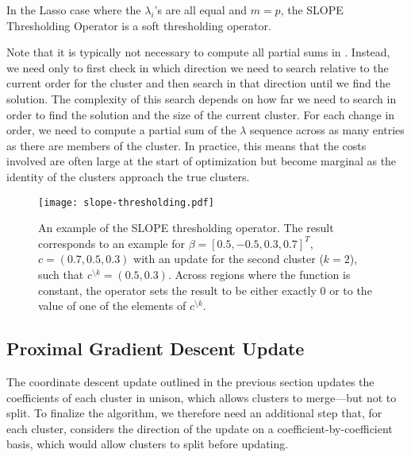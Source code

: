 
\begin{remark}
  In the Lasso case where the $\lambda_i$'s are all equal and $m = p$, the SLOPE Thresholding Operator is a soft thresholding operator.
\end{remark}

Note that it is typically not necessary to compute all partial sums in .
Instead, we need only to first check in which direction we need to search relative to the current order for the cluster and then search in that direction until we find the solution.
The complexity of this search depends on how far we need to search in order to find the solution and the size of the current cluster.
For each change in order, we need to compute a partial sum of the \(\lambda\) sequence across as many entries as there are members of the cluster.
In practice, this means that the costs involved are often large at the start of optimization but become marginal as the identity of the clusters approach the true clusters.


\begin{figure*}[htb]
  \centering
  \texttt{[image: slope-thresholding.pdf]}
  \caption{%
  An example of the SLOPE thresholding operator. The result corresponds to an
  example for \(\beta = [0.5, -0.5, 0.3, 0.7]^T\), \(c = (0.7, 0.5, 0.3)\)
  with an update for the second cluster (\(k = 2\)), such that
  \(c^{\setminus k} = (0.5, 0.3)\). Across regions where the function is constant,
      the operator sets the result to be either exactly 0 or to the value of one
      of the elements of \(c^{\setminus k}\).
    }
  \label{fig:slope-thresholding}
\end{figure*}

\subsection{Proximal Gradient Descent Update}
\label{sec:pgd-update}

The coordinate descent update outlined in the previous section updates the coefficients of each cluster in unison, which allows clusters to merge---but not to split.
To finalize the algorithm, we therefore need an additional step that, for each cluster, considers the direction of the update on a coefficient-by-coefficient basis, which would allow clusters to split before updating.

